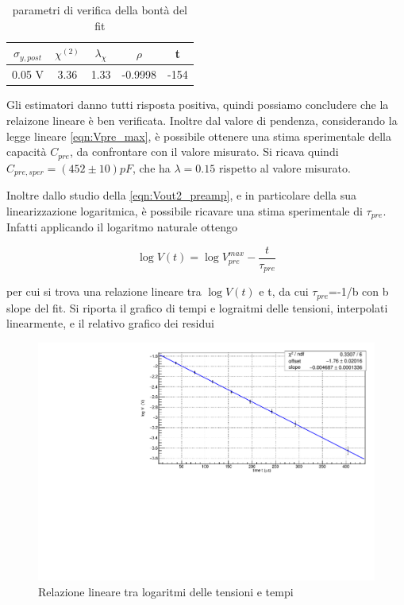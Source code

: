 \documentclass{article}
\begin{document}
\begin{table}[ht]
    \centering
    \begin{tabular}{ccccc}
        \toprule
        $\sigma_{y, post}$    &$\chi^{(2)}$    &$\lambda_{\chi}$   &$\rho$ &t   \\
        \midrule
        0.05 V                &3.36            &1.33               &-0.9998&-154\\
        \bottomrule
    \end{tabular}
    \caption{parametri di verifica della bontà del fit}
\end{table}

Gli estimatori danno tutti risposta positiva, quindi possiamo concludere che la relaizone lineare è ben verificata.
Inoltre dal valore di pendenza, considerando la legge lineare \ref{eqn:Vpre_max}, è possibile ottenere una stima sperimentale della capacità $C_{pre}$, 
da confrontare con il valore misurato. Si ricava quindi $C_{pre,sper} = (452\pm 10)pF$, che ha $\lambda = 0.15 $ rispetto al valore misurato.

Inoltre dallo studio della \ref{eqn:Vout2_preamp}, e in particolare della sua linearizzazione logaritmica, è possibile ricavare
una stima sperimentale di $\tau_{pre}$. Infatti applicando il logaritmo naturale ottengo

\begin{equation}
    \log V(t) = \log V_{pre}^{max} - \frac{t}{\tau_{pre}}
\end{equation}

per cui si trova una relazione lineare tra $\log V(t)$ e t, da cui $\tau_{pre}$=-1/b con b slope del fit.
Si riporta il grafico di tempi e lograitmi delle tensioni, interpolati linearmente, e il relativo grafico dei residui

\begin{center}
\begin{figure}[H]
\centering
\includegraphics[scale=0.4, angle=0]{preampRC.pdf}
\caption{Relazione lineare tra logaritmi delle tensioni e tempi}
\label{fig:QinvsVpre}
\end{figure}
\end{center}
\end{document}

